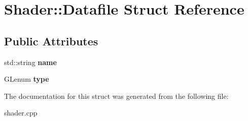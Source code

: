 \hypertarget{structShader_1_1Datafile}{}\section{Shader\+::Datafile Struct Reference}
\label{structShader_1_1Datafile}
\subsection*{Public Attributes}
\begin{DoxyCompactItemize}
\item 
\mbox{\label{structShader_1_1Datafile_a27bc2c04ba3e3616a55f1d9d4dc8c70a}} 
std\+::string {\bfseries name}
\item 
\mbox{\label{structShader_1_1Datafile_a677efbaaaf9d79fd4cdd06b0d252bbe8}} 
G\+Lenum {\bfseries type}
\end{DoxyCompactItemize}


The documentation for this struct was generated from the following file\+:\begin{DoxyCompactItemize}
\item 
shader.\+cpp\end{DoxyCompactItemize}
